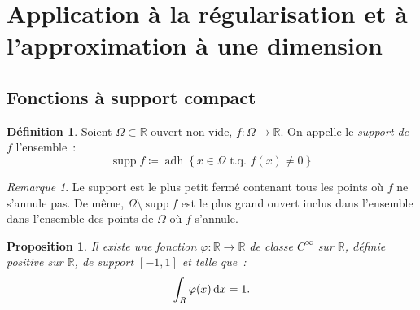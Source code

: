 \documentclass{report}
\newtheorem{prp}[thm]{Proposition}
\theoremstyle{definition}
\newtheorem{déf}[thm]{Définition}
\theoremstyle{remark}
\newtheorem*{rmq}{Remarque}
\numberwithin{equation}{section}
\newcommand{\R}{\mathbb R}
\newcommand{\tq}{\text{ t.q. }}
\DeclareMathOperator{\supp}{supp}
\DeclareMathOperator{\adh}{adh}
\begin{document}
	\section{Application à la régularisation et à l'approximation à une dimension}
		\subsection{Fonctions à support compact}
			\begin{déf} Soient $\Omega \subset \R$ ouvert non-vide, $f : \Omega \to \R$. On appelle le \textit{support de $f$} l'ensemble~:
			\begin{equation}
				\supp f \coloneqq \adh \left\{x \in \Omega \tq f(x) \neq 0\right\}
			\end{equation}
			\end{déf}

			\begin{rmq} Le support est le plus petit fermé contenant tous les points où $f$ ne s'annule pas. De même, $\Omega \setminus \supp f$ est le plus
			grand ouvert inclus dans l'ensemble dans l'ensemble des points de $\Omega$ où $f$ s'annule.
			\end{rmq}

			\begin{prp} Il existe une fonction $\varphi : \R \to \R$ de classe $C^\infty$ sur $\R$, définie positive sur $\R$, de support $[-1, 1]$ et telle que~:
			\begin{equation}
				\int_R \varphi(x)\dif x = 1.
			\end{equation}
			\end{prp}
\end{document}
